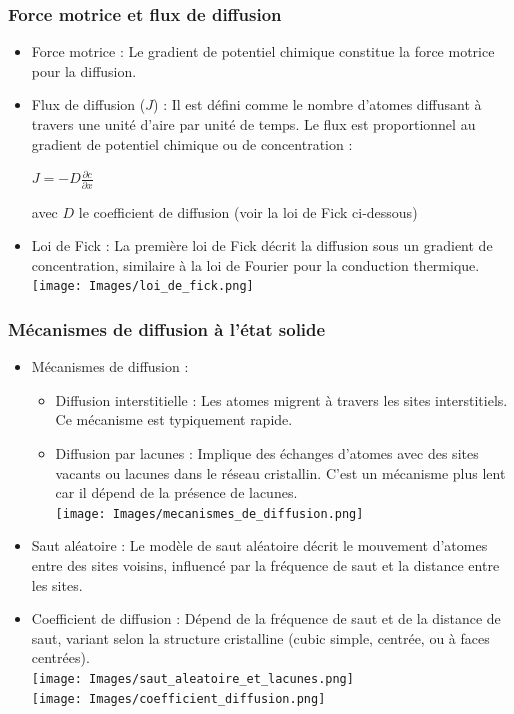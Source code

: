 \documentclass{article}
\begin{document}
        \subsubsection{Force motrice et flux de diffusion}
        \begin{itemize}
            \item Force motrice : Le gradient de potentiel chimique constitue la force motrice pour la diffusion.
            \item Flux de diffusion ($J$) : Il est défini comme le nombre d'atomes diffusant à travers une unité d'aire par unité de temps. Le flux est proportionnel au gradient de potentiel chimique ou de concentration :
            \begin{center}
                $J = -D \frac{\partial c}{\partial x}$
            \end{center}
            avec $D$ le coefficient de diffusion (voir la loi de Fick ci-dessous)
            \item Loi de Fick : La première loi de Fick décrit la diffusion sous un gradient de concentration, similaire à la loi de Fourier pour la conduction thermique.
                \texttt{[image: Images/loi\_de\_fick.png]}
        \end{itemize}

        \subsubsection{Mécanismes de diffusion à l'état solide}
        \begin{itemize}
            \item Mécanismes de diffusion :
            \begin{itemize}
                \item Diffusion interstitielle : Les atomes migrent à travers les sites interstitiels. Ce mécanisme est typiquement rapide.
                \item Diffusion par lacunes : Implique des échanges d'atomes avec des sites vacants ou lacunes dans le réseau cristallin. C'est un mécanisme plus lent car il dépend de la présence de lacunes.\\
                    \texttt{[image: Images/mecanismes\_de\_diffusion.png]}
            \end{itemize}
            \item Saut aléatoire : Le modèle de saut aléatoire décrit le mouvement d'atomes entre des sites voisins, influencé par la fréquence de saut et la distance entre les sites.
            \pagebreak
            \item Coefficient de diffusion : Dépend de la fréquence de saut et de la distance de saut, variant selon la structure cristalline (cubic simple, centrée, ou à faces centrées). \\
                \texttt{[image: Images/saut\_aleatoire\_et\_lacunes.png]} \\
                \texttt{[image: Images/coefficient\_diffusion.png]}
        \end{itemize}
\end{document}
